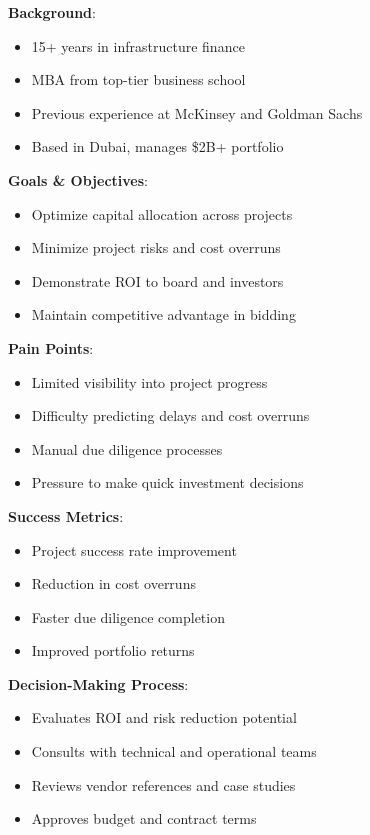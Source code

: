 \documentclass[business]{../templates/infraradar-main}
\begin{document}
\textbf{Background}:
\begin{itemize}
    \item 15+ years in infrastructure finance
    \item MBA from top-tier business school
    \item Previous experience at McKinsey and Goldman Sachs
    \item Based in Dubai, manages \$2B+ portfolio
\end{itemize}

\textbf{Goals \& Objectives}:
\begin{itemize}
    \item Optimize capital allocation across projects
    \item Minimize project risks and cost overruns
    \item Demonstrate ROI to board and investors
    \item Maintain competitive advantage in bidding
\end{itemize}

\textbf{Pain Points}:
\begin{itemize}
    \item Limited visibility into project progress
    \item Difficulty predicting delays and cost overruns
    \item Manual due diligence processes
    \item Pressure to make quick investment decisions
\end{itemize}

\textbf{Success Metrics}:
\begin{itemize}
    \item Project success rate improvement
    \item Reduction in cost overruns
    \item Faster due diligence completion
    \item Improved portfolio returns
\end{itemize}

\textbf{Decision-Making Process}:
\begin{itemize}
    \item Evaluates ROI and risk reduction potential
    \item Consults with technical and operational teams
    \item Reviews vendor references and case studies
    \item Approves budget and contract terms
\end{itemize}
\end{document}
